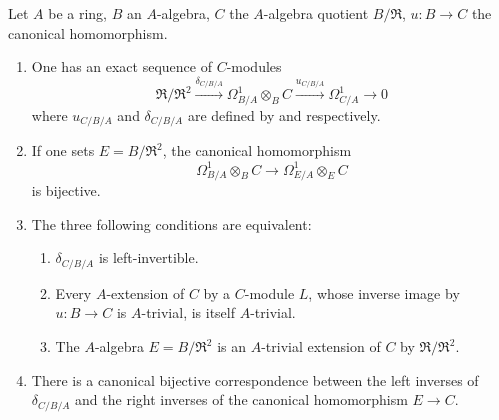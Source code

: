 \begin{theorem}[20.5.12]
\label{0.20.5.12}
Let $A$ be a ring, $B$ an $A$-algebra, $C$ the $A$-algebra quotient $B/\mathfrak{R}$, $u:B\to C$ the canonical homomorphism.
\begin{enumerate}
  \item[\rm(i)] One has an exact sequence of $C$-modules
\begin{equation}
\tag{20.5.12.1}
  \label{0.20.5.12.1}
  \mathfrak{R}/\mathfrak{R}^2\xrightarrow{\delta_{C/B/A}}\Omega^1_{B/A}\otimes_B C\xrightarrow{u_{C/B/A}}\Omega^1_{C/A}\to 0
\end{equation}
where $u_{C/B/A}$ and $\delta_{C/B/A}$ are defined by  and  respectively.
  \item[\rm(ii)] If one sets $E=B/\mathfrak{R}^2$, the canonical homomorphism 
\[
  \Omega^1_{B/A}\otimes_B C\to\Omega^1_{E/A}\otimes_E C
\]
is bijective.
  \item[\rm(iii)] The three following conditions are equivalent:
  \begin{enumerate}
    \item[\rm a)] $\delta_{C/B/A}$ is left-invertible.
    \item[\rm b)] Every $A$-extension of $C$ by a $C$-module $L$, whose inverse image by $u:B\to C$ is $A$-trivial, is itself $A$-trivial.
    \item[\rm c)] The $A$-algebra $E=B/\mathfrak{R}^2$ is an $A$-trivial extension of $C$ by $\mathfrak{R}/\mathfrak{R}^2$.
  \end{enumerate}
  \item[\rm(iv)] There is a canonical bijective correspondence between the left inverses of $\delta_{C/B/A}$ and the right inverses of the canonical homomorphism $E\to C$.
\end{enumerate}
\end{theorem}

